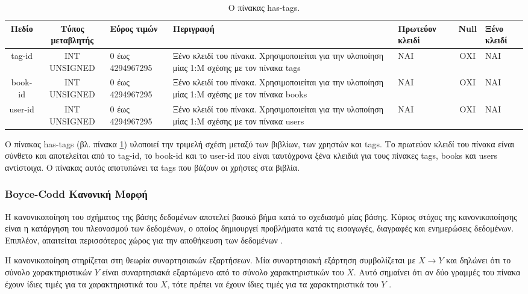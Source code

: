 \documentclass{assignment}
\begin{document}
\begin{landscape}
\begin{table}[htbp]
\begin{center}
  \begin{tabular}{|c|c|m{}|m{}|m{2.0cm}|c|m{1.5cm}|}
    \hline
    {\bf Πεδίο} & {\bf Τύπος μεταβλητής} & {\bf Εύρος τιμών} & {\bf Περιγραφή} & {\bf Πρωτεύον κλειδί} & {\bf Null} & {\bf Ξένο κλειδί} \\ \hline
    tag-id & INT UNSIGNED & 0 έως 4294967295 & Ξένο κλειδί του πίνακα. Χρησιμοποιείται για την υλοποίηση μίας 1:Μ σχέσης με τον πίνακα tags & ΝΑΙ & ΟΧΙ & NAI \\ \hline
    book-id & INT UNSIGNED & 0 έως 4294967295 & Ξένο κλειδί του πίνακα. Χρησιμοποιείται για την υλοποίηση μίας 1:Μ σχέσης με τον πίνακα books & ΝΑΙ & ΟΧΙ & NAI \\ \hline
    user-id & INT UNSIGNED & 0 έως 4294967295 & Ξένο κλειδί του πίνακα. Χρησιμοποιείται για την υλοποίηση μίας 1:Μ σχέσης με τον πίνακα users & ΝΑΙ & ΟΧΙ & NAI \\ \hline
  \end{tabular}
\caption{Ο πίνακας has-tags.}
\label{table:db_table:has-tags}
\end{center}
\end{table}

Ο πίνακας has-tags (βλ. πίνακα \ref{table:db_table:has-tags}) υλοποιεί την τριμελή σχέση μεταξύ των βιβλίων, των χρηστών και tags. Το πρωτεύον κλειδί του πίνακα είναι σύνθετο και αποτελείται από το tag-id, το book-id και το user-id που είναι ταυτόχρονα ξένα κλειδιά για τους πίνακες  tags, books και users αντίστοιχα. Ο πίνακας αυτός αποτυπώνει τα tags που βάζουν οι χρήστες στα βιβλία.
\end{landscape} 

\subsubsection{Boyce-Codd Κανονική Μορφή}

Η κανονικοποίηση του σχήματος της βάσης δεδομένων αποτελεί βασικό βήμα κατά το σχεδιασμό μίας βάσης. Κύριος στόχος της κανονικοποίησης είναι η κατάργηση του πλεονασμού των δεδομένων, ο οποίος δημιουργεί προβλήματα κατά τις εισαγωγές, διαγραφές και ενημερώσεις δεδομένων. Επιπλέον, απαιτείται περισσότερος χώρος για την αποθήκευση των δεδομένων \cite{baseis_manolopoulos, wiki:normalization}. 

Η κανονικοποίηση στηρίζεται στη θεωρία συναρτησιακών εξαρτήσεων. Μία συναρτησιακή εξάρτηση συμβολίζεται με $X \rightarrow Y$ και δηλώνει ότι το σύνολο χαρακτηριστικών $Y$ είναι συναρτησιακά εξαρτώμενο από το σύνολο χαρακτηριστικών του $X$. Αυτό σημαίνει ότι αν δύο γραμμές του πίνακα έχουν ίδιες τιμές για τα χαρακτηριστικά του $X$, τότε πρέπει να έχουν ίδιες τιμές για τα χαρακτηριστικά του $Y$ \cite{baseis_manolopoulos}.
\end{document}
